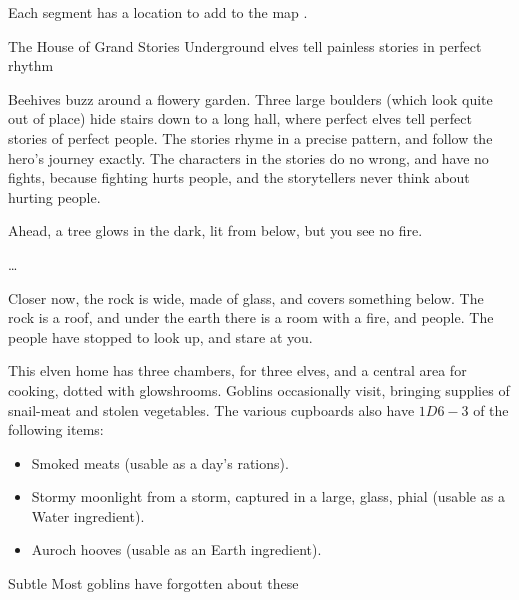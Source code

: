
Each \gls{segment} has a location to add to the map .

{The House of Grand Stories}%
{Underground elves tell painless stories in perfect rhythm}%

Beehives buzz around a flowery garden.
Three large boulders (which look quite out of place) hide stairs down to a long hall, where perfect elves tell perfect stories of perfect people.
The stories rhyme in a precise pattern, and follow the hero's journey exactly.
The characters in the stories do no wrong, and have no fights, because fighting hurts people, and the storytellers never think about hurting people.

\begin{boxtext}
  Ahead, a tree glows in the dark, lit from below, but you see no fire.

  \ldots

  Closer now, the rock is  wide, made of glass, and covers something below.
  The rock is a roof, and under the earth there is a room with a fire, and people.
  The people have stopped to look up, and stare at you.
\end{boxtext}

This elven home has three chambers, for three elves, and a central area for cooking, dotted with \glspl{glowshroom}.
Goblins occasionally visit, bringing supplies of snail-meat and stolen vegetables.
The various cupboards also have $1D6-3$ of the following items:

\begin{itemize}
  \item
  Smoked meats (usable as a day's \glspl{ration}).
  \item
  Stormy moonlight from a storm, captured in a large, glass, phial (usable as a Water \gls{ingredient}).
  \item
  Auroch hooves (usable as an Earth \gls{ingredient}).
\end{itemize}



%

{Subtle }%
{Most goblins have forgotten about these }%

